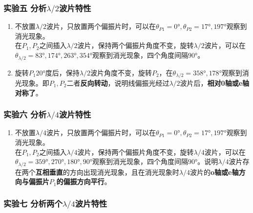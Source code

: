 \documentclass[dvipsnames, svgnames,a4paper,11pt]{article}
\begin{document}
	





	\subsubsection{实验五 \quad 分析$\lambda/2$波片特性}

	\begin{enumerate}
		\item 不放置$\lambda/2$波片，只放置两个偏振片时，可以在$\theta_{P1}=\ang{0},\theta_{P2}=\ang{17},\ang{197}$观察到消光现象。	\\
			在$P_1,P_2$之间插入$\lambda/2$波片，保持两个偏振片角度不变，旋转$\lambda/2$波片，可以在$\theta_{\lambda/2}=\ang{83},\ang{174},\ang{263},\ang{354}$观察到消光现象，四个角度间隔$\ang{90}$。
		\item 旋转$P_1\ang{20}$度后，保持$\lambda/2$波片角度不变，旋转$P_2$，在$\theta_{\lambda/2}=\ang{358},\ang{178}$观察到消光现象。即$P_1,P_2$二者\textbf{反向转动}，说明线偏振光经过$\lambda/2$波片后，\textbf{相对0轴或e轴对称了}。
	\end{enumerate}
	







	\subsubsection{实验六 \quad 分析$\lambda/4$波片特性}

	\begin{enumerate}
		\item 不放置$\lambda/4$波片，只放置两个偏振片时，可以在$\theta_{P1}=\ang{0},\theta_{P2}=\ang{17},\ang{197}$观察到消光现象。	\\
		
		在$P_1,P_2$之间插入$\lambda/4$波片，保持两个偏振片角度不变，旋转$\lambda/4$波片，可以在$\theta_{\lambda/2}=\ang{359},\ang{270},\ang{180},\ang{90}$观察到消光现象，四个角度间隔$\ang{90}$。说明$\lambda/4$波片存在两个\textbf{互相垂直}的方向出现消光现象，且在消光现象时$\lambda/4$波片的\textbf{o轴或e轴方向与偏振片$P_1$的偏振方向平行}。

		
	\end{enumerate}







	\subsubsection{实验七 \quad 分析两个$\lambda/4$波片特性}
\end{document}
